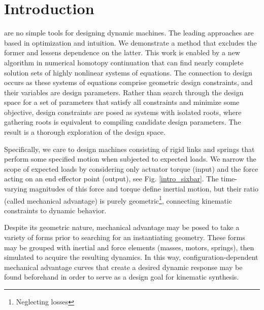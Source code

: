 \documentclass[journal]{IEEEtran}
\begin{document}
\section{Introduction}
\label{sec:intro}
% 
% 
% 
% 
 are no simple tools for designing dynamic machines.
The leading approaches are based in optimization and intuition.
We demonstrate a method that excludes the former and lessens dependence on the latter.
This work is enabled by a new algorithm in numerical homotopy continuation that can find nearly complete solution sets of highly nonlinear systems of equations.
%
The connection to design occurs as these systems of equations comprise geometric design constraints, and their variables are design parameters.
Rather than search through the design space for a set of parameters that satisfy all constraints and minimize some objective, design constraints are posed as systems with isolated roots, where gathering roots is equivalent to compiling candidate design parameters.  The result is a thorough exploration of the design space.


Specifically, we care to design machines consisting of rigid links and springs that perform some specified motion when subjected to expected loads.
We narrow the scope of expected loads by considering only actuator torque (input) and the force acting on an end effector point (output), see Fig. \ref{intro_sixbar}.
The time-varying magnitudes of this force and torque define inertial motion, but their ratio (called mechanical advantage) is purely geometric\footnote{Neglecting losses}, connecting kinematic constraints to dynamic behavior.

Despite its geometric nature, mechanical advantage may be posed to take a variety of forms prior to searching for an instantiating geometry.
These forms may be grouped with inertial and force elements (masses, motors, springs), then simulated to acquire the resulting dynamics.
In this way, configuration-dependent mechanical advantage curves that create a desired dynamic response may be found beforehand in order to serve as a design goal for kinematic synthesis.
\end{document}
